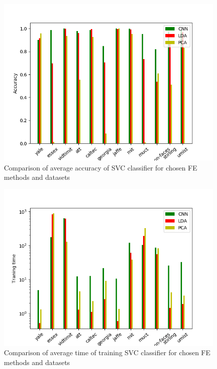 \documentclass[a4paper, 10 pt, conference]{ieeeconf}
\begin{document}
\begin{figure}[!h]
    \centering
    \includegraphics[scale=0.875]{images/Svm_accuracy_comparison.png}
    \caption{Comparison of average accuracy of SVC classifier for chosen FE methods and datasets}
    \label{fig:svm_acc_comparision}
\end{figure}

\begin{figure}[!h]
    \centering
    \includegraphics[scale=0.875]{images/Svm_fit_time_comparison.png}
    \caption{Comparison of average time of training SVC classifier for chosen FE methods and datasets}
    \label{fig:svm_fit_time_comparision}
\end{figure}
\end{document}
